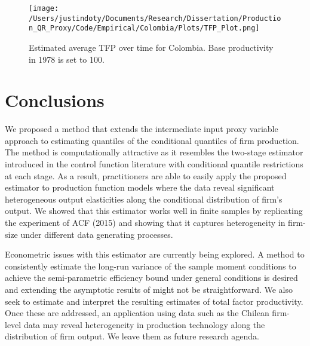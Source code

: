 \documentclass[11pt]{article}
\begin{document}
\begin{figure}[H]
\centering
\texttt{[image: /Users/justindoty/Documents/Research/Dissertation/Production\_QR\_Proxy/Code/Empirical/Colombia/Plots/TFP\_Plot.png]}
\caption{Estimated average TFP over time for Colombia. Base productivity in 1978 is set to 100.}
\end{figure}

\section{Conclusions} \label{conclusion}

We proposed a method that extends the intermediate input proxy variable approach to estimating quantiles of the conditional quantiles of firm production. The method is computationally attractive as it resembles the two-stage estimator introduced in the control function literature with conditional quantile restrictions at each stage. As a result, practitioners are able to easily apply the proposed estimator to production function models where the data reveal significant heterogeneous output elasticities along the conditional distribution of firm's output. We showed that this estimator works well in finite samples by replicating the experiment of ACF (2015) and showing that it captures heterogeneity in firm-size under different data generating processes.  

Econometric issues with this estimator are currently being explored. A method to consistently estimate the long-run variance of the sample moment conditions to achieve the semi-parametric efficiency bound under general conditions is desired and extending the asymptotic results of \cite*{qgmm} might not be straightforward. We also seek to estimate and interpret the resulting estimates of total factor productivity. Once these are addressed, an application using data such as the Chilean firm-level data may reveal heterogeneity in production technology along the distribution of firm output. 
We leave them as future research agenda.


\pagebreak
\newpage











\end{document}
